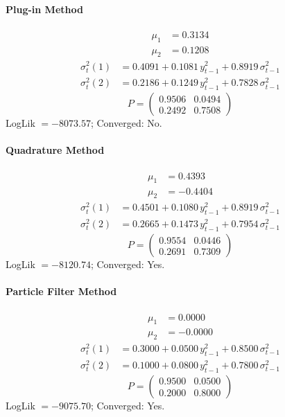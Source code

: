 \documentclass[11pt, a4paper]{article}
\begin{document}
\paragraph{Plug-in Method}
\begin{align}
\mu_{1} &= 0.3134 \\
\mu_{2} &= 0.1208
\end{align}
\begin{align}
\sigma^2_{t}(1) &= 0.4091 + 0.1081\, y_{t-1}^2 + 0.8919\, \sigma^2_{t-1} \\
\sigma^2_{t}(2) &= 0.2186 + 0.1249\, y_{t-1}^2 + 0.7828\, \sigma^2_{t-1}
\end{align}
\begin{equation}
P = \begin{pmatrix} 0.9506 & 0.0494 \\ 0.2492 & 0.7508 \end{pmatrix}
\end{equation}
LogLik $= -8073.57$; Converged: No.

\paragraph{Quadrature Method}
\begin{align}
\mu_{1} &= 0.4393 \\
\mu_{2} &= -0.4404
\end{align}
\begin{align}
\sigma^2_{t}(1) &= 0.4501 + 0.1080\, y_{t-1}^2 + 0.8919\, \sigma^2_{t-1} \\
\sigma^2_{t}(2) &= 0.2665 + 0.1473\, y_{t-1}^2 + 0.7954\, \sigma^2_{t-1}
\end{align}
\begin{equation}
P = \begin{pmatrix} 0.9554 & 0.0446 \\ 0.2691 & 0.7309 \end{pmatrix}
\end{equation}
LogLik $= -8120.74$; Converged: Yes.

\paragraph{Particle Filter Method}
\begin{align}
\mu_{1} &= 0.0000 \\
\mu_{2} &= -0.0000
\end{align}
\begin{align}
\sigma^2_{t}(1) &= 0.3000 + 0.0500\, y_{t-1}^2 + 0.8500\, \sigma^2_{t-1} \\
\sigma^2_{t}(2) &= 0.1000 + 0.0800\, y_{t-1}^2 + 0.7800\, \sigma^2_{t-1}
\end{align}
\begin{equation}
P = \begin{pmatrix} 0.9500 & 0.0500 \\ 0.2000 & 0.8000 \end{pmatrix}
\end{equation}
LogLik $= -9075.70$; Converged: Yes.
\end{document}
